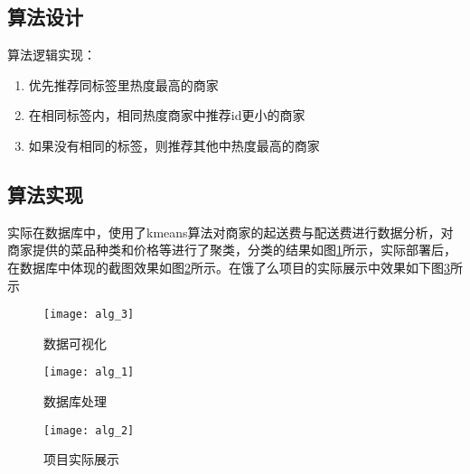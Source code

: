 \subsection{算法设计}
算法逻辑实现：
\begin{enumerate}
	\item 优先推荐同标签里热度最高的商家
	\item 在相同标签内，相同热度商家中推荐id更小的商家
	\item 如果没有相同的标签，则推荐其他中热度最高的商家
\end{enumerate}
\subsection{算法实现}
实际在数据库中，使用了kmeans算法对商家的起送费与配送费进行数据分析，对商家提供的菜品种类和价格等进行了聚类，分类的结果如图\ref{fig:alg_3}所示，实际部署后，在数据库中体现的截图效果如图\ref{fig:alg_1}所示。在饿了么项目的实际展示中效果如下图\ref{fig:alg_2}所示
\begin{figure}[htbp]
	\centering
	\texttt{[image: alg\_3]}
	\caption{数据可视化}
	\label{fig:alg_3}
	\vspace{\baselineskip}
\end{figure}
\begin{figure}[htbp]
	\centering
	\texttt{[image: alg\_1]}
	\caption{数据库处理}
	\label{fig:alg_1}
	\vspace{\baselineskip}
\end{figure}
\begin{figure}[htbp]
	\centering
	\texttt{[image: alg\_2]}
	\caption{项目实际展示}
	\label{fig:alg_2}
	\vspace{\baselineskip}
\end{figure}